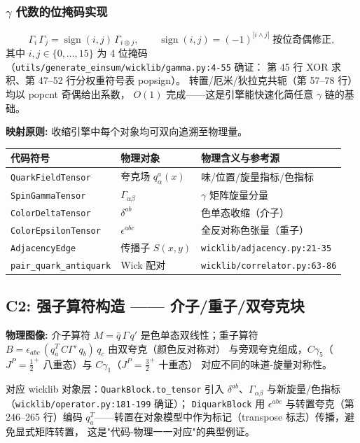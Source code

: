 \documentclass[UTF8]{ctexart}
\begin{document}
\subsubsection{$\gamma$ 代数的位掩码实现}
\begin{equation}\label{eq:gamma_mul}
\Gamma_i\,\Gamma_j = \operatorname{sign}(i,j)\,\Gamma_{i\oplus j},\qquad
\operatorname{sign}(i,j)=(-1)^{|i\land j|}\;\text{按位奇偶修正},
\end{equation}
其中 $i,j\in\{0,\dots,15\}$ 为 4 位掩码（\nolinkurl{utils/generate_einsum/wicklib/gamma.py:4-55} 确证：
第 45 行 XOR 求积、第 47--52 行分权重符号表 popsign）。
\textcolor{phys}{转置/厄米/狄拉克共轭}（第 57--78 行）均以 popcnt 奇偶给出系数，
$O(1)$ 完成——这是引擎能快速化简任意 $\gamma$ 链的基础。

\begin{mapbox}
\textbf{映射原则:} 收缩引擎中每个对象均可双向追溯至物理量。
\end{mapbox}
\begin{xltabular}{\textwidth}{llX}
\toprule
\textcolor{map}{代码符号} & 物理对象 & 物理含义与参考源 \\
\midrule
\endhead
\texttt{QuarkFieldTensor} & 夸克场 $q_\alpha^a(x)$ & 味/位置/旋量指标/色指标 \\
\texttt{SpinGammaTensor} & $\Gamma_{\alpha\beta}$ & $\gamma$ 矩阵旋量分量 \\
\texttt{ColorDeltaTensor} & $\delta^{ab}$ & 色单态收缩（介子） \\
\texttt{ColorEpsilonTensor} & $\epsilon^{abc}$ & 全反对称色张量（重子） \\
\texttt{AdjacencyEdge} & 传播子 $S(x,y)$ & \nolinkurl{wicklib/adjacency.py:21-35} \\
\texttt{pair\_quark\_antiquark} & Wick 配对 & \nolinkurl{wicklib/correlator.py:63-86} \\
\bottomrule
\end{xltabular}

\subsection{C2: 强子算符构造 —— 介子/重子/双夸克块}
\begin{physbox}
\textbf{物理图像:} 介子算符 $M=\bar q\,\Gamma\,q'$ 是色单态双线性；重子算符
$B=\epsilon_{abc}\,(q_a^T\,C\Gamma'\,q_b)\,q_c$ 由双夸克（颜色反对称对）
与旁观夸克组成，$C\gamma_5$（$J^P=\tfrac12^+$ 八重态）与 $C\gamma_1$（$J^P=\tfrac32^+$ 十重态）
对应不同的味道-旋量对称性。
\end{physbox}

对应 wicklib 对象层：\texttt{QuarkBlock.to\_tensor} 引入 $\delta^{ab}$、$\Gamma_{\alpha\beta}$
与新旋量/色指标（\nolinkurl{wicklib/operator.py:181-199} 确证）；
\texttt{DiquarkBlock} 用 $\epsilon^{abc}$ 与转置夸克（第 246--265 行）编码
$q_a^T$——转置在对象模型中作为标记（transpose 标志）传播，避免显式矩阵转置，
这是"代码-物理一一对应"的典型例证。
\end{document}

